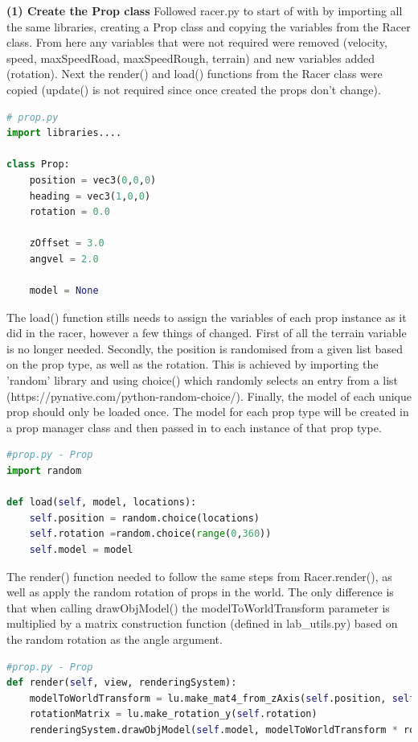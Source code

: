 \documentclass[a4 paper, 12pt]{article}
\begin{document}
\textbf{(1) Create the Prop class}
Followed racer.py to start of with by importing all the same libraries, creating a Prop class and copying the variables from the Racer class. From here any variables that were not required were removed (velocity, speed, maxSpeedRoad, maxSpeedRough, terrain) and new variables added (rotation). Next the render() and load() functions from the Racer class were copied (update() is not required since once created the props don't change).
    \begin{lstlisting}[language=python]
# prop.py
import libraries....

class Prop:
    position = vec3(0,0,0)    
    heading = vec3(1,0,0)
    rotation = 0.0

    zOffset = 3.0
    angvel = 2.0
    
    model = None
    \end{lstlisting}

The load() function stills needs to assign the variables of each prop instance as it did in the racer, however a few things of changed. First of all the terrain variable is no longer needed. Secondly, the position is randomised from a given list based on the prop type, as well as the rotation. This is achieved by importing the 'random' library and using choice() which randomly selects an entry from a list (https://pynative.com/python-random-choice/). Finally, the model of each unique prop should only be loaded once. The model for each prop type will be created in a prop manager class and then passed in to each instance of that prop type.
    \begin{lstlisting}[language=python]
#prop.py - Prop
import random

def load(self, model, locations):      
    self.position = random.choice(locations)
    self.rotation =random.choice(range(0,360))
    self.model = model
    \end{lstlisting}

The render() function needed to follow the same steps from Racer.render(), as well as apply the random rotation of props in the world. The only difference is that when calling drawObjModel() the modelToWorldTransform parameter is multiplied by a matrix construction function (defined in lab\_utils.py) based on the random rotation as the angle argument. 
    \begin{lstlisting}[language=python]
#prop.py - Prop
def render(self, view, renderingSystem):
    modelToWorldTransform = lu.make_mat4_from_zAxis(self.position, self.heading, [ 0.0, 0.0, 1.0 ])
    rotationMatrix = lu.make_rotation_y(self.rotation)
    renderingSystem.drawObjModel(self.model, modelToWorldTransform * rotationMatrix, view)
    \end{lstlisting}
 
\end{document}
